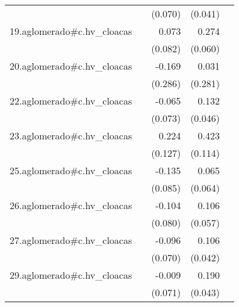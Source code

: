 {\begin{longtable}{l*{4}{D{.}{.}{-1}}}
            &                     &     (0.070)         &     (0.041)         &                     \\
\addlinespace
19.aglomerado#c.hv\_cloacas&                     &       0.073         &       0.274\sym{***}&                     \\
            &                     &     (0.082)         &     (0.060)         &                     \\
\addlinespace
20.aglomerado#c.hv\_cloacas&                     &      -0.169         &       0.031         &                     \\
            &                     &     (0.286)         &     (0.281)         &                     \\
\addlinespace
22.aglomerado#c.hv\_cloacas&                     &      -0.065         &       0.132\sym{**} &                     \\
            &                     &     (0.073)         &     (0.046)         &                     \\
\addlinespace
23.aglomerado#c.hv\_cloacas&                     &       0.224         &       0.423\sym{***}&                     \\
            &                     &     (0.127)         &     (0.114)         &                     \\
\addlinespace
25.aglomerado#c.hv\_cloacas&                     &      -0.135         &       0.065         &                     \\
            &                     &     (0.085)         &     (0.064)         &                     \\
\addlinespace
26.aglomerado#c.hv\_cloacas&                     &      -0.104         &       0.106         &                     \\
            &                     &     (0.080)         &     (0.057)         &                     \\
\addlinespace
27.aglomerado#c.hv\_cloacas&                     &      -0.096         &       0.106\sym{*}  &                     \\
            &                     &     (0.070)         &     (0.042)         &                     \\
\addlinespace
29.aglomerado#c.hv\_cloacas&                     &      -0.009         &       0.190\sym{***}&                     \\
            &                     &     (0.071)         &     (0.043)         &                     \\

\end{longtable}}
